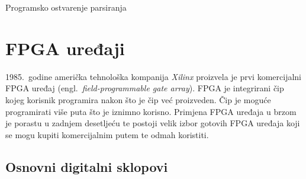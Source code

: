 \documentclass[times, utf8, diplomski]{fer}
\begin{document}
\begin{algorithm}
	\caption{Programsko ostvarenje parsiranja}
\end{algorithm}


\section{FPGA uređaji} \label{sec:fpga}

1985.~godine američka tehnološka kompanija \textit{Xilinx} proizvela je prvi komercijalni FPGA uređaj (engl.~\textit{field-programmable gate array}). FPGA je integrirani čip kojeg korisnik programira nakon što je čip već proizveden. Čip je moguće programirati više puta što je iznimno korisno. Primjena FPGA uređaja u brzom je porastu u zadnjem desetljeću te postoji velik izbor gotovih FPGA uređaja koji se mogu kupiti komercijalnim putem te odmah koristiti.

\subsection{Osnovni digitalni sklopovi}
\end{document}
